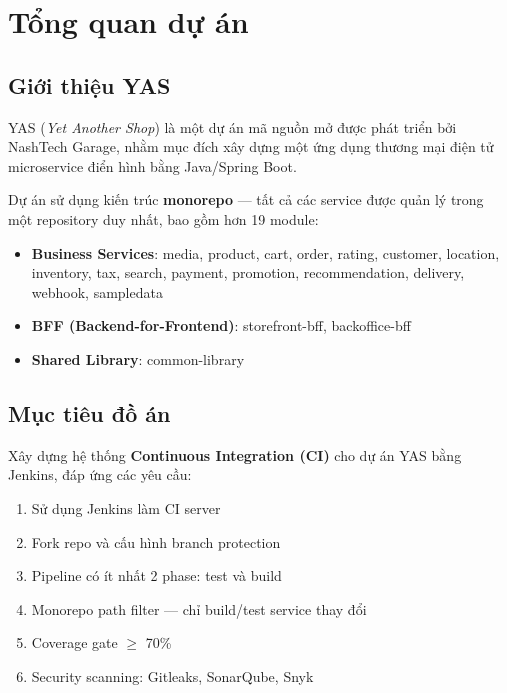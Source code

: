 \section{Tổng quan dự án}

\subsection{Giới thiệu YAS}
YAS (\textit{Yet Another Shop}) là một dự án mã nguồn mở được phát triển bởi NashTech Garage, nhằm mục đích xây dựng một ứng dụng thương mại điện tử microservice điển hình bằng Java/Spring Boot.

Dự án sử dụng kiến trúc \textbf{monorepo} --- tất cả các service được quản lý trong một repository duy nhất, bao gồm hơn 19 module:
\begin{itemize}[noitemsep]
    \item \textbf{Business Services}: media, product, cart, order, rating, customer, location, inventory, tax, search, payment, promotion, recommendation, delivery, webhook, sampledata
    \item \textbf{BFF (Backend-for-Frontend)}: storefront-bff, backoffice-bff
    \item \textbf{Shared Library}: common-library
\end{itemize}

\subsection{Mục tiêu đồ án}
Xây dựng hệ thống \textbf{Continuous Integration (CI)} cho dự án YAS bằng Jenkins, đáp ứng các yêu cầu:
\begin{enumerate}[noitemsep]
    \item Sử dụng Jenkins làm CI server
    \item Fork repo và cấu hình branch protection
    \item Pipeline có ít nhất 2 phase: test và build
    \item Monorepo path filter --- chỉ build/test service thay đổi
    \item Coverage gate $\geq$ 70\%
    \item Security scanning: Gitleaks, SonarQube, Snyk
\end{enumerate}

